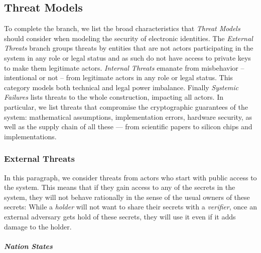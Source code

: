 \subsection{Threat Models}
\label{subsub:threat_models}

To complete the \emph{\rot} branch, we list the broad characteristics that \emph{Threat Models} should consider when modeling the security of electronic identities.
The \emph{External Threats} branch groups threats by entities that are not actors participating in the system in any role or legal status and as such do not have access to private keys to make them legitimate actors.
\emph{Internal Threats} emanate from misbehavior -- intentional or not -- from legitimate actors in any role or legal status. This category models both technical and legal power imbalance.
Finally \emph{Systemic Failures} lists threats to the whole construction, impacting all actors. In particular, we list threats that compromise the cryptographic guarantees of the system: mathematical assumptions, implementation errors, hardware security, as well as the supply chain of all these --- from scientific papers to silicon chips and implementations.

\vspace{1em}



\subsubsection{External Threats}

In this paragraph, we consider threats from actors who start with public access
to the system.
This means that if they gain access to any of the secrets in the system, they will
not behave rationally in the sense of the usual owners of these secrets:
While a \emph{holder} will not want to share their secrets with a \emph{verifier},
once an external adversary gets hold of these secrets, they will use it even if it adds
damage to the holder.

\subparagraph{Nation States}
\label{subp:nation_state}

